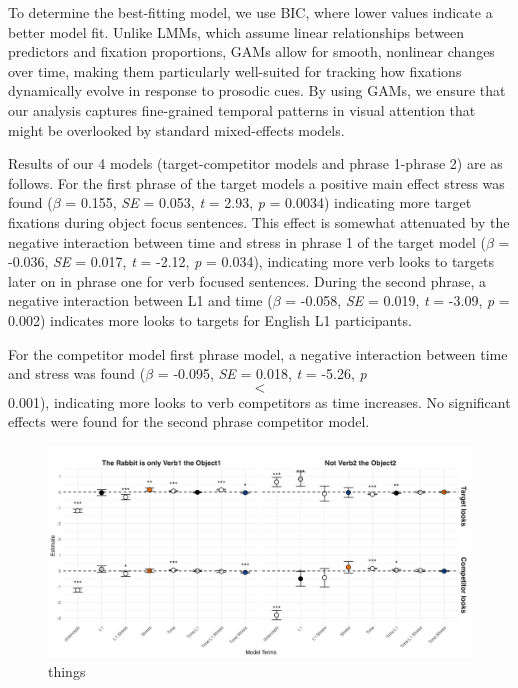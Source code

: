 To determine the best-fitting model, we use BIC, where lower values indicate a better model fit. Unlike LMMs, which assume linear relationships between predictors and fixation proportions, GAMs allow for smooth, nonlinear changes over time, making them particularly well-suited for tracking how fixations dynamically evolve in response to prosodic cues. By using GAMs, we ensure that our analysis captures fine-grained temporal patterns in visual attention that might be overlooked by standard mixed-effects models.

Results of our 4 models (target-competitor models and phrase 1-phrase 2) are as follows. For the first phrase of the target models a positive main effect stress was found ($\beta$ = 0.155, \textit{SE} = 0.053, \textit{t} = 2.93, \textit{p} = 0.0034) indicating more target fixations during object focus sentences. This effect is somewhat attenuated by the negative interaction between time and stress in phrase 1 of the target model ($\beta$ = -0.036, \textit{SE} = 0.017, \textit{t} = -2.12, \textit{p} = 0.034), indicating more verb looks to targets later on in phrase one for verb focused sentences. During the second phrase, a negative interaction between L1 and time ($\beta$ = -0.058, \textit{SE} = 0.019, \textit{t} = -3.09, \textit{p} = 0.002) indicates more looks to targets for English L1 participants.

For the competitor model first phrase model, a negative interaction between time and stress was found ($\beta$ = -0.095, \textit{SE} = 0.018, \textit{t} = -5.26, \textit{p} $$<$$ 0.001), indicating more looks to verb competitors as time increases. No significant effects were found for the second phrase competitor model.


\begin{figure}[H]  %
    \centering
    \includegraphics[width=\textwidth,height=\textheight,keepaspectratio]{viz/gam_mod_out.png}
    \caption{things}
    \label{fig:gam_mod_out}
\end{figure}

